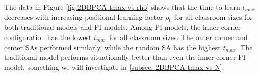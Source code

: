 The data in Figure \ref{fig:2DBPCA tmax vs rho} shows that the time to learn $t_{max}$ decreases with increasing positional learning factor $\rho_0$ for all classroom sizes for both traditional models and PI models. Among PI models, the inner corner configuration has the lowest $t_{max}$ for all classroom sizes. The outer corner and center SAs performed similarly, while the random SA has the highest $t_{max}$. The traditional model performs situationally better than even the inner corner PI model, something we will investigate in \ref{subsec: 2DBPCA tmax vs N}.

\begin{figure}[htbp!]
    \centering

\end{figure}
